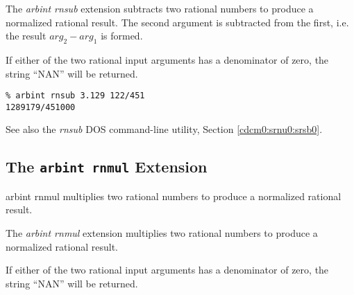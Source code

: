 \begin{tclcommandsynopsis}
\end{tclcommandsynopsis}

\begin{tclcommanddescription}
The \emph{arbint rnsub} extension subtracts two rational numbers to produce a 
normalized rational result.  The second argument is subtracted from the first, i.e.
the result $arg_2 - arg_1$ is formed.

If either of the two rational input arguments has a denominator of zero,
the string ``NAN'' will be returned.
\end{tclcommanddescription}

\begin{tclcommandsampleinvocations}
\begin{scriptsize}
\begin{verbatim}
% arbint rnsub 3.129 122/451
1289179/451000
\end{verbatim}
\end{scriptsize}
\end{tclcommandsampleinvocations}

\begin{tclcommandseealso}
See also the \emph{rnsub} DOS command-line utility, 
Section \ref{cdcm0:srnu0:srsb0}.
\end{tclcommandseealso}

\subsection{The \texttt{arbint rnmul} Extension}
\label{cxtn0:srne0:srmu0}

\begin{tclcommandname}{arbint rnmul}%
multiplies two rational numbers to produce a normalized rational result.
\end{tclcommandname}

\begin{tclcommandsynopsis}
\end{tclcommandsynopsis}

\begin{tclcommanddescription}
The \emph{arbint rnmul} extension multiplies two rational numbers to produce a 
normalized rational result.

If either of the two rational input arguments has a denominator of zero,
the string ``NAN'' will be returned.
\end{tclcommanddescription}

